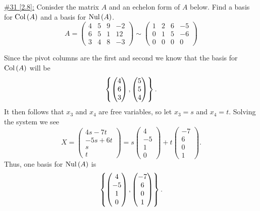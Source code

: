 \documentclass{exam}
\begin{document}
\underline{\#31 [2.8]:} Conisder the matrix $A$ and an echelon form of $A$ below. Find a basis for $\text{Col}\left(A\right)$ and a basis for $\text{Nul}\left(A\right)$.
\[
    A = \begin{pmatrix}
        4 & 5 & 9 & -2 \\
        6 & 5 & 1 & 12 \\
        3 & 4 & 8 & -3 
    \end{pmatrix}
    \sim
    \begin{pmatrix}
        1 & 2 & 6 & -5 \\
        0 & 1 & 5 & -6 \\
        0 & 0 & 0 & 0
    \end{pmatrix}
\]
\begin{solution}
    Since the pivot columns are the first and second we know that the basis for $\text{Col}\left(A\right)$ will be 
    \[
        \left\{\begin{pmatrix}
            4 \\ 6 \\ 3
        \end{pmatrix}, 
        \begin{pmatrix}
            5 \\ 5 \\ 4
        \end{pmatrix} \right\}.
    \]
    It then follows that $x_3$ and $x_4$ are free variables, so let $x_3 = s$ and $x_4 = t$. Solving the system we see 
    \[
        X = \begin{pmatrix}
            4s - 7t \\
            -5s + 6t \\
            s \\ 
            t
        \end{pmatrix}
        = 
        s\begin{pmatrix}
            4 \\ -5 \\ 1 \\ 0
        \end{pmatrix}
        + t\begin{pmatrix}
            -7 \\ 6 \\ 0 \\ 1
        \end{pmatrix}.
    \]
    Thus, one basis for $\text{Nul}\left(A\right)$ is 
    \[
        \left\{
        \begin{pmatrix}
            4 \\ -5 \\ 1 \\ 0
        \end{pmatrix}
        , \begin{pmatrix}
            -7 \\ 6 \\ 0 \\ 1
        \end{pmatrix}
         \right\}.
    \]
\end{solution}
\end{document}
